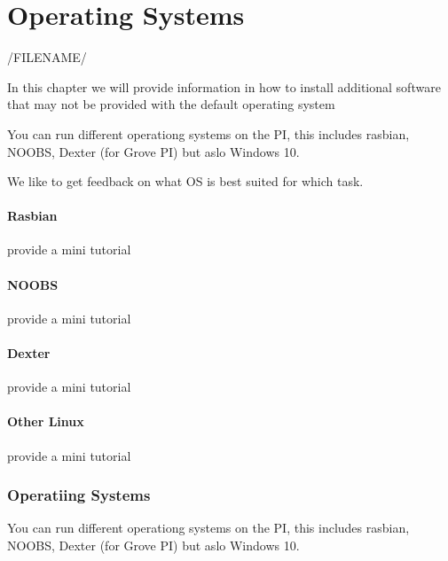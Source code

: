 \chapter{Operating Systems}

/FILENAME/

In this chapter we will provide information in how to install additional software that may not be provided with the default operating system

You can run different operationg systems on the PI, this includes 
rasbian, NOOBS, Dexter (for Grove PI) but aslo Windows 10.

We like to get feedback on what OS is best suited for which task.

\subsubsection{Rasbian}

\begin{exercise}
provide a mini tutorial 
\end{exercise}

\subsubsection{NOOBS}

\begin{exercise}
provide a mini tutorial 
\end{exercise}

\subsubsection{Dexter}

\begin{exercise}
provide a mini tutorial 
\end{exercise}

\subsubsection{Other Linux}

\begin{exercise}
provide a mini tutorial 
\end{exercise}

\subsection{Operatiing Systems}

You can run different operationg systems on the PI, this includes 
rasbian, NOOBS, Dexter (for Grove PI) but aslo Windows 10.

